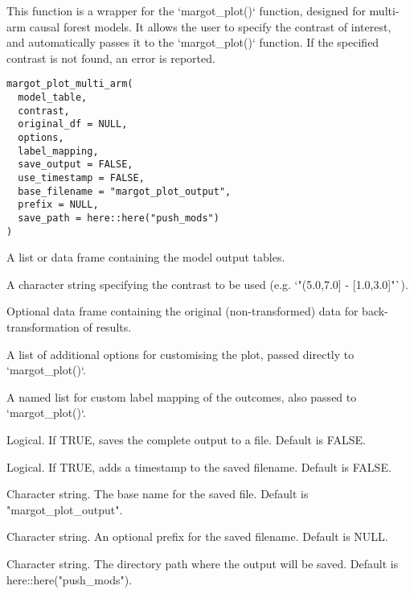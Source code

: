 \documentclass[a4paper]{book}
\begin{document}
%
\begin{Description}
This function is a wrapper for the `margot\_plot()` function, designed for multi-arm causal forest models.
It allows the user to specify the contrast of interest, and automatically passes it to the `margot\_plot()` function.
If the specified contrast is not found, an error is reported.
\end{Description}
%
\begin{Usage}
\begin{verbatim}
margot_plot_multi_arm(
  model_table,
  contrast,
  original_df = NULL,
  options,
  label_mapping,
  save_output = FALSE,
  use_timestamp = FALSE,
  base_filename = "margot_plot_output",
  prefix = NULL,
  save_path = here::here("push_mods")
)
\end{verbatim}
\end{Usage}
%
\begin{Arguments}
\begin{ldescription}
\item[\code{model\_table}] A list or data frame containing the model output tables.

\item[\code{contrast}] A character string specifying the contrast to be used (e.g. `"(5.0,7.0] - [1.0,3.0]"`).

\item[\code{original\_df}] Optional data frame containing the original (non-transformed) data for back-transformation of results.

\item[\code{options}] A list of additional options for customising the plot, passed directly to `margot\_plot()`.

\item[\code{label\_mapping}] A named list for custom label mapping of the outcomes, also passed to `margot\_plot()`.

\item[\code{save\_output}] Logical. If TRUE, saves the complete output to a file. Default is FALSE.

\item[\code{use\_timestamp}] Logical. If TRUE, adds a timestamp to the saved filename. Default is FALSE.

\item[\code{base\_filename}] Character string. The base name for the saved file. Default is "margot\_plot\_output".

\item[\code{prefix}] Character string. An optional prefix for the saved filename. Default is NULL.

\item[\code{save\_path}] Character string. The directory path where the output will be saved. Default is here::here("push\_mods").
\end{ldescription}
\end{Arguments}
\end{document}
